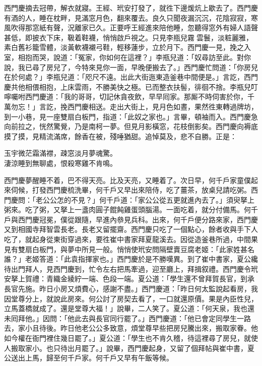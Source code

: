 西門慶摘去冠帶，解衣就寢。王經、玳安打發了，就徃下邊煖炕上歇去了。西門慶有酒的人，睡在枕畔，見滿窓月色，翻來覆去。良久只聞夜漏沉沉，花陰寂寂，寒風吹得那窓紙有聲，況離家已久。正要呼王經進來陪他睡，忽聽得窓外有婦人語聲甚低，即披衣下床，靸着鞋襪，悄悄啟戶視之。只見李瓶兒霧𩬆雲鬟，淡粧麗雅，素白舊衫籠雪體，淡黃軟襪襯弓鞋，輕移蓮步，立於月下。{}西門慶一見，挽之入室，相抱而哭，說道：「冤家，你如何在這裡？」李瓶兒道：「奴尋訪至此。對你說，我已尋了房兒了，今特來見你一面，早晚便搬去了。」西門慶忙問道：「你房兒在於何處？」李瓶兒道：「咫尺不遠。出此大街迤東造釜巷中間便是。」言訖，西門慶共他相偎相抱，上床雲雨，不勝美快之極。已而整衣扶髻，徘徊不捨。李瓶兒叮嚀囑咐西門慶道：「我的哥哥，切記休貪夜飲，早早囘家。那厮不時伺害於你，千萬勿忘！」言訖，挽西門慶相送。走出大街上，見月色如晝，果然徃東轉過牌坊，到一小巷，見一座雙扇白板門，指道：「此奴之家也。」言畢，頓袖而入。西門慶急向前拉之，恍然驚覺，乃是南柯一夢。但見月影橫窓，花枝倒影矣。{}西門慶向褥底摸了摸，見精流滿席，餘香在被，殘唾猶甜。追悼莫及，悲不自勝。正是：

\begin{myquote}
玉宇微茫霜滿襟，疎窓淡月夢魂驚。\\淒涼睡到無聊處，恨殺寒雞不肯鳴。
\end{myquote}

西門慶夢醒睡不着，巴不得天亮。比及天亮，又睡着了。次日早，何千戶家童僕起來伺候，打發西門慶梳洗畢，何千戶又早出來陪侍，吃了薑茶，放桌兒請吃粥。西門慶問：「老公公怎的不見？」何千戶道：「家公公從五更就進內去了。」須臾拏上粥來。吃了粥，又拏上一盞肉圓子餛飩雞蛋頭腦湯。一面吃着，就分付備馬。何千戶與西門慶冠冕，僕從跟隨，早進內叅見兵科。出來，何千戶便分路來家，西門慶又到相國寺拜智雲長老。{}長老又留擺齋。西門慶只吃了一個點心，餘者收與手下人吃了，就起身從東街穿過來，要徃崔中書家拜夏龍溪去。因從造釜巷所過，中間果見有雙扇白板門，與夢中所見一般。悄悄使玳安問隔壁賣豆腐老姬：「此家姓甚名誰？」老姬答道：「此袁指揮家也。」西門慶於是不勝嘆異。到了崔中書家，夏公纔待出門拜人，見西門慶到，忙令左右把馬牽過，迎至廳上，拜揖叙禮。西門慶令玳安拏上賀禮：青織金綾紵一端、色段一端。夏公道：「學生還不曾拜賀長官，到承長官先施。昨日小房又煩費心，感謝不盡。」西門慶道：「昨日何太監說起看房，我因堂尊分上，就說此房來。何公討了房契去看了，一口就還原價。果是內臣性兒，立馬蓋橋就成了。還是堂尊大福！」說畢，二人笑了。夏公道：「何天泉，我也還未囘拜他。」因問：「他此去與長官同行罷了。」西門慶道：「他已會定同學生一路去，家小且待後。昨日他老公公多致意，煩堂尊早些把房兒騰出來，搬取家眷。他如今權在衙門裡住幾日罷了。」夏公道：「學生也不肯久稽，待這裡尋了房兒，就使人搬取家小。也只待出月罷了。」說畢，西門慶起身，又留了個拜帖與崔中書，夏公送出上馬，歸至何千戶家。何千戶又早有午飯等候。

